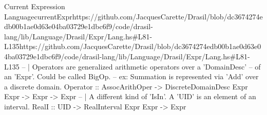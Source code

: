 \begin{haskell}{Current Expression Language}{currentExpr}{https://github.com/JacquesCarette/Drasil/blob/dc3674274edb00b1ae0d63e04ba03729e1dbc\linebreak{}6f9/code/drasil-lang/lib/Language/Drasil/Expr/Lang.hs\#L81-L135}{https://github.com/JacquesCarette/Drasil/blob/dc3674274edb00b1ae0d63e04ba03729e1dbc6f9/code/drasil-lang/lib/Language/Drasil/Expr/Lang.hs\#L81-L135}
    -- | Operators are generalized arithmetic operators over a 'DomainDesc'
    --   of an 'Expr'.  Could be called BigOp.
    --   ex: Summation is represented via 'Add' over a discrete domain.
    Operator :: AssocArithOper -> DiscreteDomainDesc Expr Expr -> Expr -> Expr
    -- | A different kind of 'IsIn'. A 'UID' is an element of an interval.
    RealI    :: UID -> RealInterval Expr Expr -> Expr
\end{haskell}
